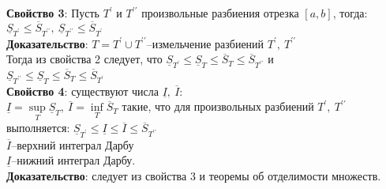 \documentclass[a4paper,12pt]{article} %
\begin{document}
\noindent \textbf{Свойство 3}: Пусть $T^{\prime}$ и $T^{\prime\prime}$ произвольные разбиения отрезка $[a,b]$, тогда:
$\underline{S}_{T^{\prime}}\leq \overline{S}_{T^{\prime\prime}},~\underline{S}_{T^{\prime\prime}}\leq \overline{S}_{T^{\prime}}$\\
\noindent \textbf{Доказательство}: $T = T^{\prime}\cup T^{\prime\prime}$--измельчение разбиений $T^{\prime},~ T^{\prime\prime}$\\
Тогда из свойства 2 следует, что $\underline{S}_{T^{\prime}}\leq \underline{S}_T\leq \overline{S}_T\leq \overline{S}_{T^{\prime\prime}}$ и\\
$\underline{S}_{T^{\prime\prime}}\leq \underline{S}_T\leq \overline{S}_T\leq \overline{S}_{T^{\prime}}$\\

\noindent \textbf{Свойство 4}: существуют числа $\underline{I},~\overline{I}$:\\
$\underline{I}=\sup\limits_{T}{\underline{S}_T,~\overline{I}=\inf\limits_{T}{\overline{S}_T}}$ такие, что для произвольных разбиений $T^{\prime},~T^{\prime\prime}$ выполняется: 
$\underline{S}_{T^{\prime}}\leq \underline{I}\leq \overline{I}\leq \overline{S}_{T^{\prime\prime}}$\\
$\overline{I}$--верхний интеграл Дарбу\\
$\underline{I}$--нижний интеграл Дарбу.\\
\noindent \textbf{Доказательство}: следует из свойства 3 и теоремы об отделимости множеств.\\
\end{document}
